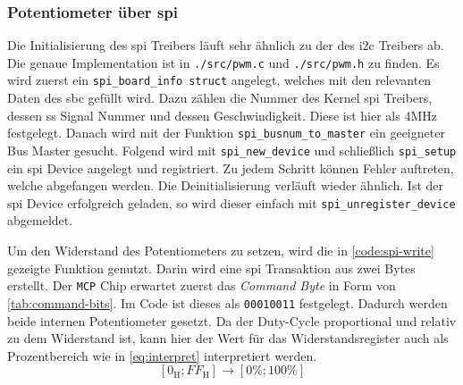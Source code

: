 \subsubsection{Potentiometer über \acrshort{spi}}

Die Initialisierung des \gls{spi} Treibers läuft sehr ähnlich zu der des \gls{i2c} Treibers ab.
Die genaue Implementation ist in \texttt{./src/pwm.c} und \texttt{./src/pwm.h} zu finden.
Es wird zuerst ein \texttt{spi\_board\_info struct} angelegt, welches mit den relevanten Daten des \gls{sbc} gefüllt wird.
Dazu zählen die Nummer des Kernel \gls{spi} Treibers, dessen \gls{ss} Signal Nummer und dessen Geschwindigkeit.
Diese ist hier als $4\si{\mega\hertz}$ festgelegt.
Danach wird mit der Funktion \texttt{spi\_busnum\_to\_master} ein geeigneter Bus Master gesucht.
Folgend wird mit \texttt{spi\_new\_device} und schließlich \texttt{spi\_setup} ein \gls{spi} Device angelegt und registriert.
Zu jedem Schritt können Fehler auftreten, welche abgefangen werden.
Die Deinitialisierung verläuft wieder ähnlich.
Ist der \gls{spi} Device erfolgreich geladen, so wird dieser einfach mit \texttt{spi\_unregister\_device} abgemeldet.

Um den Widerstand des Potentiometers zu setzen, wird die in \autoref{code:spi-write} gezeigte Funktion genutzt.
Darin wird eine \gls{spi} Transaktion aus zwei Bytes erstellt.
Der \texttt{MCP} Chip erwartet zuerst das \textit{Command Byte} in Form von \autoref{tab:command-bits}.
Im Code ist dieses als \texttt{00010011} festgelegt.
Dadurch werden beide internen Potentiometer gesetzt.
Da der Duty-Cycle proportional und relativ zu dem Widerstand ist, kann hier der Wert für das Widerstandsregister auch als Prozentbereich wie in \autoref{eq:interpret} interpretiert werden.
\begin{equation}
    \left[0_{\text{H}}; FF_{\text{H}}\right] \rightarrow \left[0\%; 100\%\right]
    \label{eq:interpret}
\end{equation}



